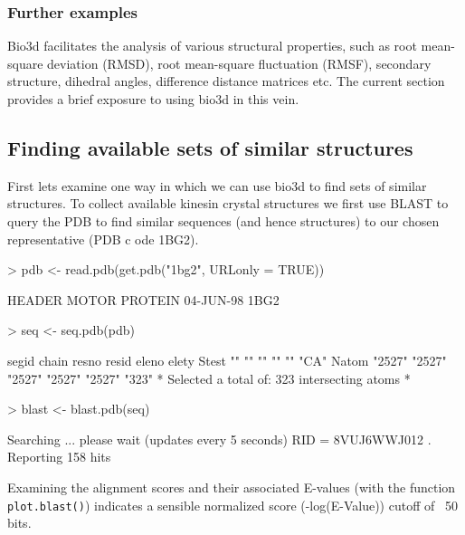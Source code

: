 \documentclass[a4paper]{article}
\begin{document}

\subsubsection{Further examples}
Bio3d facilitates the analysis of various structural properties, such as root mean-square deviation (RMSD), root mean-square fluctuation (RMSF), secondary structure, dihedral angles, difference distance matrices etc. The current section provides a brief exposure to using bio3d in this vein. 

\subsection{Finding available sets of similar structures}
First lets examine one way in which we can use bio3d to find sets of similar structures. To collect available kinesin crystal structures we first use BLAST to query the PDB to find similar sequences (and hence structures) to our chosen representative (PDB c ode 1BG2).

\begin{Schunk}
\begin{Sinput}
> pdb <- read.pdb(get.pdb("1bg2", URLonly = TRUE))
\end{Sinput}
\begin{Soutput}
  HEADER    MOTOR PROTEIN                           04-JUN-98   1BG2               
\end{Soutput}
\begin{Sinput}
> seq <- seq.pdb(pdb)
\end{Sinput}
\begin{Soutput}
      segid  chain  resno  resid  eleno  elety
Stest ""     ""     ""     ""     ""     "CA" 
Natom "2527" "2527" "2527" "2527" "2527" "323"
 *  Selected a total of: 323 intersecting atoms  *
\end{Soutput}
\begin{Sinput}
> blast <- blast.pdb(seq)
\end{Sinput}
\begin{Soutput}
 Searching ... please wait (updates every 5 seconds) RID = 8VUJ6WWJ012 
 .
 Reporting 158 hits
\end{Soutput}
\end{Schunk}
Examining the alignment scores and their associated E-values (with the function \texttt{plot.blast()}) indicates a sensible normalized score (-log(E-Value)) cutoff of ~50 bits.
\end{document}
